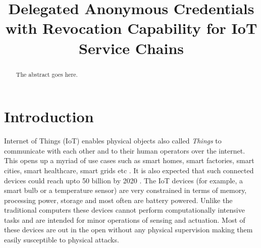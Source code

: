\documentclass[journal]{IEEEtran}
\begin{document}
\def\HS{\hspace{\fontdimen2\font}}\the{}\font
\title{Delegated Anonymous Credentials with Revocation Capability for IoT Service Chains}
\author{

}

\IEEEoverridecommandlockouts
{}

\maketitle

\begin{abstract}
The abstract goes here.
\end{abstract}

\begin{IEEEkeywords}

\end{IEEEkeywords}



\IEEEpeerreviewmaketitle



\section{Introduction} \label{introduction}

Internet of Things (IoT) enables physical objects also called \textit{Things}  to communicate with each other and to their human operators over the internet. This opens up a myriad of use cases such as smart homes, smart factories, smart cities, smart healthcare, smart grids etc \cite{IoT}. It is also expected that such connected devices could reach upto 50 billion by 2020 \cite{Evans}. The IoT devices (for example, a smart bulb or a temperature sensor) are very constrained in terms of memory, processing power, storage and most often are battery powered. Unlike the traditional computers these devices cannot perform computationally intensive tasks and are intended for minor operations of sensing and actuation. Most of these devices are out in the open without any physical supervision making them easily susceptible to physical attacks.
\end{document}
